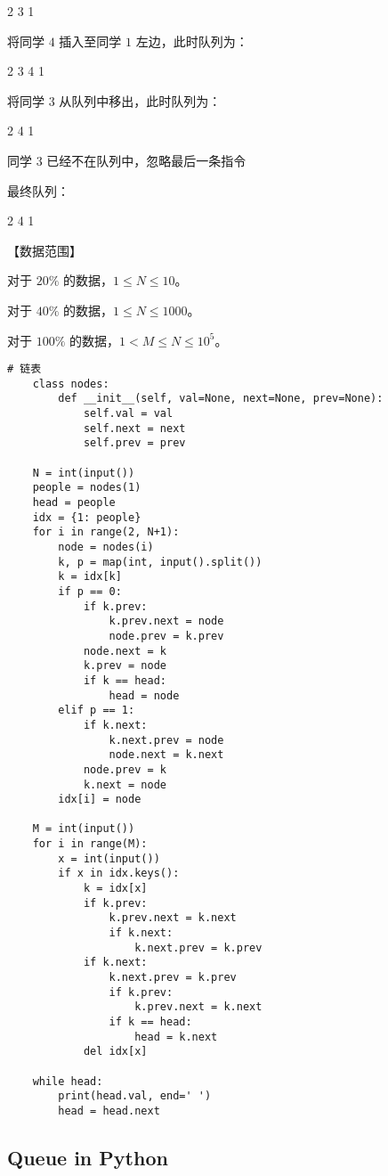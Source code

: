 \documentclass[../main]{subfiles}
\begin{document}
2 3 1  

将同学 $4$ 插入至同学 $1$ 左边，此时队列为：

2 3 4 1  

将同学 $3$ 从队列中移出，此时队列为：

2 4 1

同学 $3$ 已经不在队列中，忽略最后一条指令

最终队列：

2 4 1  

【数据范围】

对于 $20\%$ 的数据，$1\leq N\leq 10$。

对于 $40\%$ 的数据，$1\leq N\leq 1000$。

对于 $100\%$ 的数据，$1<M\leq N\leq 10^5$。


\begin{lstlisting}[style = Python]
    # 链表
    class nodes:
        def __init__(self, val=None, next=None, prev=None):
            self.val = val
            self.next = next
            self.prev = prev
    
    N = int(input())
    people = nodes(1)
    head = people
    idx = {1: people}
    for i in range(2, N+1):
        node = nodes(i)
        k, p = map(int, input().split())
        k = idx[k]
        if p == 0:
            if k.prev:
                k.prev.next = node
                node.prev = k.prev
            node.next = k
            k.prev = node
            if k == head:
                head = node
        elif p == 1:
            if k.next:
                k.next.prev = node
                node.next = k.next
            node.prev = k
            k.next = node
        idx[i] = node
        
    M = int(input())
    for i in range(M):
        x = int(input())
        if x in idx.keys():
            k = idx[x]
            if k.prev:
                k.prev.next = k.next
                if k.next:
                    k.next.prev = k.prev
            if k.next:
                k.next.prev = k.prev
                if k.prev:
                    k.prev.next = k.next
                if k == head:
                    head = k.next
            del idx[x]
    
    while head:
        print(head.val, end=' ')
        head = head.next
\end{lstlisting}

\subsection{Queue in Python}
\end{document}
